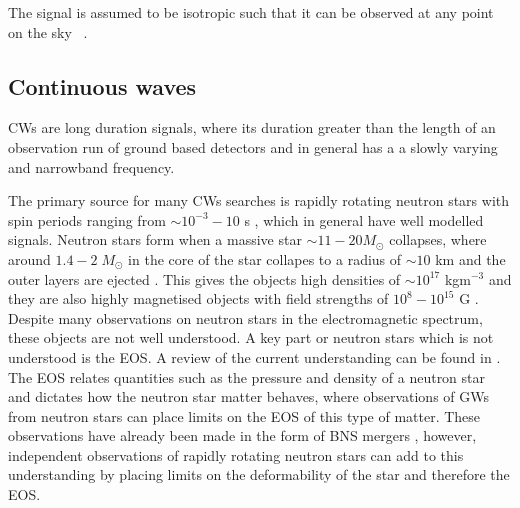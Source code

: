 The signal is
assumed to be isotropic such that it can be observed at any point on the sky
\citep{christensen2018StochasticGravitational}~.




\subsection{\label{intro:sources:cw}Continuous waves}

\glspl{CW} are long duration signals, where its duration greater than
the length of an observation run of ground based detectors and in general has a
a slowly varying and narrowband frequency. 

The primary source for many \glspl{CW} searches is rapidly rotating neutron
stars with spin periods ranging from $\sim 10^{-3} - 10$ s
\citep{manchester2005AustraliaTelescope}, which in general have well modelled signals.  Neutron stars form when a
massive star $\sim 11 - 20 M_{\odot}$ collapses, where around $1.4-2 \;
M_{\odot}$ \citep{}  in the core of the star collapes to a radius of $\sim 10$ km and the outer layers are ejected \citep{} . 
This gives the objects high densities of $\sim 10^{17}$ kgm$^{-3}$ and they are also highly magnetised objects with field strengths of $10^8 - 10^{15}$ G \citep{konar2017MagneticFields}.  
Despite many observations on neutron stars in the electromagnetic spectrum,
these objects are not well understood.  A key part or neutron stars which is
not understood is the \gls{EOS}. A review of the current understanding can be
found in \cite{lattimer2016EquationState}.  The \gls{EOS} relates quantities
such as the pressure and density of a neutron star and dictates how the neutron
star matter behaves, where observations of \glspl{GW} from neutron stars can place
limits on the \gls{EOS} of this type of matter.  These observations have
already been made in the form of \gls{BNS} mergers
\citep{abbott2017GW170817Observation}, however, independent observations of
rapidly rotating neutron stars can add to this understanding by placing limits
on the deformability of the star and therefore the \gls{EOS}.

